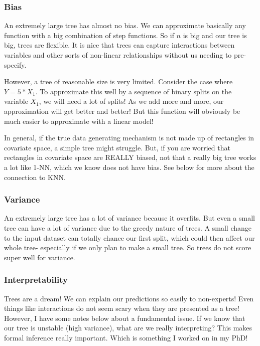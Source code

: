 \subsubsection{Bias}

An extremely large tree has almost no bias. We can approximate basically any function with a big combination of step functions. So if $n$ is big and our tree is big, trees are flexible. It is nice that trees can capture interactions between variables and other sorts of non-linear relationships without us needing to pre-specify.

However, a tree of reasonable size is very limited. Consider the case where $Y = 5 * X_1$. To approximate this well by a sequence of binary splits on the variable $X_1$, we will need a lot of splits! As we add more and more, our approximation will get better and better! But this function will obviously be much easier to approximate with a linear model!

In general, if the true data generating mechanism is not made up of rectangles in covariate space, a simple tree might struggle. But, if you are worried that rectangles in covariate space are REALLY biased, not that a really big tree works a lot like 1-NN, which we know does not have bias. See below for more about the connection to KNN. 

\subsubsection{Variance}

An extremely large tree has a lot of variance because it overfits. But even a small tree can have a lot of variance due to the greedy nature of trees. A small change to the input dataset can totally chance our first split, which could then affect our whole tree- especially if we only plan to make a small tree. So trees do not score super well for variance.

\subsubsection{Interpretability}

Trees are a dream! We can explain our predictions so easily to non-experts! Even things like interactions do not seem scary when they are presented as a tree! However, I have some notes below about a fundamental issue. If we know that our tree is unstable (high variance), what are we really interpreting? This makes formal inference really important. Which is something I worked on in my PhD!

